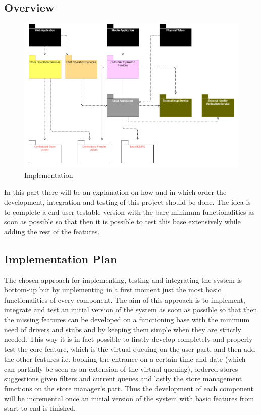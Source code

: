 \subsection{Overview}
\begin{figure}[h!]
	\includegraphics[width=\linewidth]{../Diagrams/IntegrationImplementation/IntegrationOverview.png}
	\caption{Implementation}
	\label{fig:Implementation1}
\end{figure}
In this part there will be an explanation on how and in which order the development, integration and testing of this project should be done. The idea is to complete a end user testable version with the bare minimum functionalities as soon as possible so that then it is possible to test this base extensively while adding the rest of the features.
\subsection{Implementation Plan}
The chosen approach for implementing, testing and integrating the system is bottom-up but by implementing in a first moment just the most basic functionalities of every component.
The aim of this approach is to implement, integrate and test an initial version of the system as soon as possible so that then the missing features can be developed on a functioning base with the minimum need of drivers and stubs and by keeping them simple when they are strictly needed.
This way it is in fact possible to firstly develop completely and properly test the core feature, which is the virtual queuing on the user part, and then add the other features i.e. booking the entrance on a certain time and date (which can partially be seen as an extension of the virtual queuing), ordered stores suggestions given filters and current queues and lastly the store management functions on the store manager’s part.
Thus the development of each component will be incremental once an initial version of the system with basic features from start to end is finished.
\\

